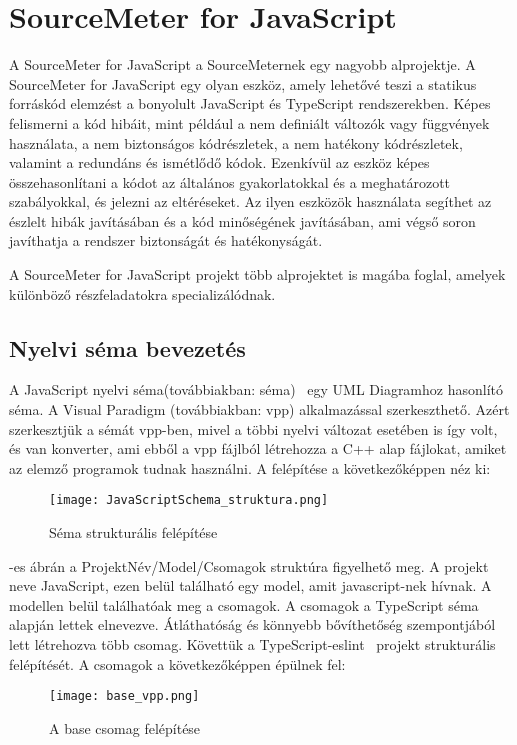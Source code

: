 \section{SourceMeter for JavaScript}
A SourceMeter for JavaScript a SourceMeternek egy nagyobb alprojektje.
A SourceMeter for JavaScript egy olyan eszköz, amely lehetővé teszi a statikus forráskód elemzést a bonyolult JavaScript és TypeScript rendszerekben.
Képes felismerni a kód hibáit, mint például a nem definiált változók vagy függvények használata, a nem biztonságos kódrészletek, a nem hatékony kódrészletek, valamint a redundáns és ismétlődő kódok.
Ezenkívül az eszköz képes összehasonlítani a kódot az általános gyakorlatokkal és a meghatározott szabályokkal, és jelezni az eltéréseket.
Az ilyen eszközök használata segíthet az észlelt hibák javításában és a kód minőségének javításában, ami végső soron javíthatja a rendszer biztonságát és hatékonyságát.


A SourceMeter for JavaScript projekt több alprojektet is magába foglal, amelyek különböző részfeladatokra specializálódnak.

\subsection{Nyelvi séma bevezetés}\label{chap:nyelvi_sema}
A JavaScript nyelvi séma(továbbiakban: séma)~\cite{ferenc2002columbus} egy UML Diagramhoz hasonlító séma.
A Visual Paradigm (továbbiakban: vpp) alkalmazással szerkeszthető.
Azért szerkesztjük a sémát vpp-ben, mivel a többi nyelvi változat esetében is így volt, és van konverter, ami ebből a vpp fájlból létrehozza a C++ alap fájlokat, amiket az elemző programok tudnak használni.
A felépítése a következőképpen néz ki:

\begin{figure}[!htbp]
      \caption{Séma strukturális felépítése}\label{fig:JavaScriptSchema_struktura}
      \centering
      \texttt{[image: JavaScriptSchema\_struktura.png]}
\end{figure}

-es ábrán a ProjektNév/Model/Csomagok struktúra figyelhető meg.
A projekt neve JavaScript, ezen belül található egy model, amit javascript-nek hívnak.
A modellen belül találhatóak meg a csomagok.
A csomagok a TypeScript séma~\cite{typescript-eslint} alapján lettek elnevezve.
Átláthatóság és könnyebb bővíthetőség szempontjából lett létrehozva több csomag.
Követtük a TypeScript-eslint~\cite{typescript-eslint} projekt strukturális felépítését.
A csomagok a következőképpen épülnek fel:
\begin{figure}[!htbp]
      \caption{A base csomag felépítése}\label{fig:base_vpp}
      \centering
      \texttt{[image: base\_vpp.png]}
\end{figure}

